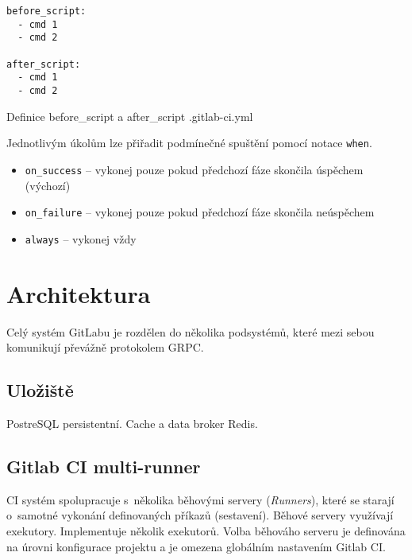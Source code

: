 \begin{listing}[ht]
\begin{verbatim}
before_script:
  - cmd 1
  - cmd 2

after_script:
  - cmd 1
  - cmd 2
\end{verbatim}
\caption{Definice before\_script a after\_script .gitlab-ci.yml}
\end{listing}

Jednotlivým úkolům lze přiřadit podmínečné spuštění pomocí notace \verb|when|.

\begin{itemize}
  \item \verb|on_success| -- vykonej pouze pokud předchozí fáze skončila úspěchem (výchozí) 
  \item \verb|on_failure| -- vykonej pouze pokud předchozí fáze skončila neúspěchem
  \item \verb|always| -- vykonej vždy
\end{itemize}

\section{Architektura}

Celý systém GitLabu je rozdělen do několika podsystémů, které mezi sebou komunikují převážně protokolem GRPC.

\cite{gitlab_architecture}



\subsection{Uložiště}

PostreSQL persistentní.
Cache a data broker Redis.


\subsection{Gitlab CI multi-runner}

CI systém spolupracuje s~několika běhovými servery (\textit{Runners}), které se starají o~samotné vykonání definovaných příkazů (sestavení).
Běhové servery využívají exekutory.
Implementuje několik exekutorů.
Volba běhováho serveru je definována na úrovni konfigurace projektu a je omezena globálním nastavením Gitlab CI.


